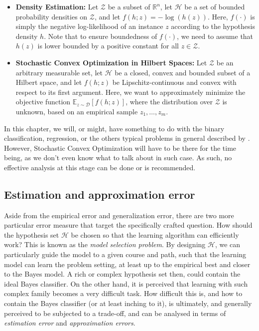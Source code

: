 \begin{itemize}[itemsep=2pt,topsep=1pt]
    \item \textbf{Density Estimation:} Let $\mathcal{Z}$ be a subset of $\mathbb{R}^n$, let $\mathcal{H}$ be a set of bounded probability densities on $\mathcal{Z}$, and let $f(h;z) = -\log(h(z))$. Here, $f(\cdot)$ is simply the negative log-likelihood of an instance $z$ according to the hypothesis density $h$. Note that to ensure boundedness of $f(\cdot)$, we need to assume that $h(z)$ is lower bounded by a positive constant for all $z \in \mathcal{Z}$.
    \item \textbf{Stochastic Convex Optimization in Hilbert Spaces:} Let $\mathcal{Z}$ be an arbitrary measurable set, let $\mathcal{H}$ be a closed, convex and bounded subset of a Hilbert space, and let $f(h;z)$ be Lipschitz-continuous and convex with respect to its first argument. Here, we want to approximately minimize the objective function $\mathbb{E}_{z\sim \mathcal{D}}\!\left[f(h;z)\right]$, where the distribution over $\mathcal{Z}$ is unknown, based on an empirical sample $z_1,\ldots,z_m$.
\end{itemize}
In this chapter, we will, or might, have something to do with the binary classification, regression, or the others typical problems in general described by \cite{Vapnik1999-VAPTNO}. However, Stochastic Convex Optimization will have to be there for the time being, as we don't even know what to talk about in such case. As such, no effective analysis at this stage can be done or is recommended. 
\subsection{Estimation and approximation error}
Aside from the empirical error and generalization error, there are two more particular error measure that target the specifically crafted question. How should the hypothesis set $\mathcal{H}$ be chosen so that the learning algorithm can efficiently work? This is known as the \textit{model selection problem}. By designing $\mathcal{H}$, we can particularly guide the model to a given course and path, such that the learning model can learn the problem setting, at least up to the empirical best and closer to the Bayes model. A rich or complex hypothesis set then, could contain the ideal Bayes classifier. On the other hand, it is perceived that learning with such complex family becomes a very difficult task. How difficult this is, and how to contain the Bayes classifier (or at least inching to it), is ultimately, and generally perceived to be subjected to a trade-off, and can be analysed in terms of \textit{estimation error} and \textit{approximation errors}. 

